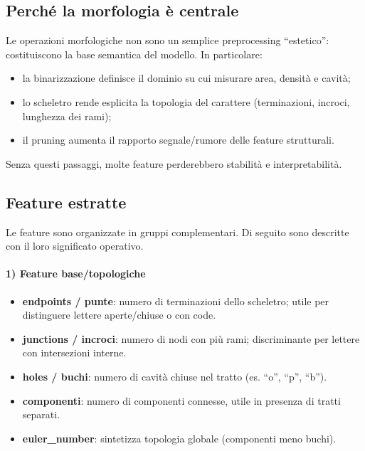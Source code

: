 \documentclass[a4paper,12pt]{article}
\begin{document}
\subsection{Perché la morfologia è centrale}
Le operazioni morfologiche non sono un semplice preprocessing ``estetico'': costituiscono la base semantica del modello.
In particolare:
\begin{itemize}[leftmargin=1.5em]
  \item la binarizzazione definisce il dominio su cui misurare area, densità e cavità;
  \item lo scheletro rende esplicita la topologia del carattere (terminazioni, incroci, lunghezza dei rami);
  \item il pruning aumenta il rapporto segnale/rumore delle feature strutturali.
\end{itemize}

Senza questi passaggi, molte feature perderebbero stabilità e interpretabilità.

\subsection{Feature estratte}
Le feature sono organizzate in gruppi complementari. Di seguito sono descritte con il loro significato operativo.

\paragraph{1) Feature base/topologiche}
\begin{itemize}[leftmargin=1.5em]
  \item \textbf{endpoints / punte}: numero di terminazioni dello scheletro; utile per distinguere lettere aperte/chiuse o con code.
  \item \textbf{junctions / incroci}: numero di nodi con più rami; discriminante per lettere con intersezioni interne.
  \item \textbf{holes / buchi}: numero di cavità chiuse nel tratto (es. ``o'', ``p'', ``b'').
  \item \textbf{componenti}: numero di componenti connesse, utile in presenza di tratti separati.
  \item \textbf{euler\_number}: sintetizza topologia globale (componenti meno buchi).
\end{itemize}
\end{document}
